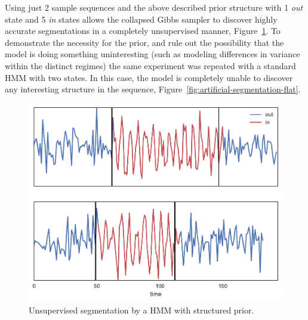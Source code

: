 \documentclass[12pt]{report}
\newcommand{\1}[0]{\mathbbm{1}}
\begin{document}
Using just 2 sample sequences and the above described prior structure with
1 \emph{out} state and 5 \emph{in} states allows the collapsed Gibbs sampler
to discover highly accurate segmentations in a completely unsupervised manner,
Figure~\ref{fig:artificial-segmentation-struct}. To demonstrate the necessity for the prior,
and rule out the possibility that the model is doing something uninteresting (such
as modeling differences in variance within the distinct regimes) the same experiment
was repeated with a standard \ac{HMM} with two states. In this case, the model is completely
unable to discover any interesting structure in the sequence,
Figure~\ref{fig:artificial-segmentation-flat}.

\begin{figure}[H]
    \centering
    \includegraphics[width=1\textwidth]{img/artificial-segment-output-struct.pdf}
    \caption[Example segmentation of synthetic sequences with structure]{
        Unsupervised segmentation by a HMM with structured prior.
    }
    \label{fig:artificial-segmentation-struct}
\end{figure}
\end{document}
